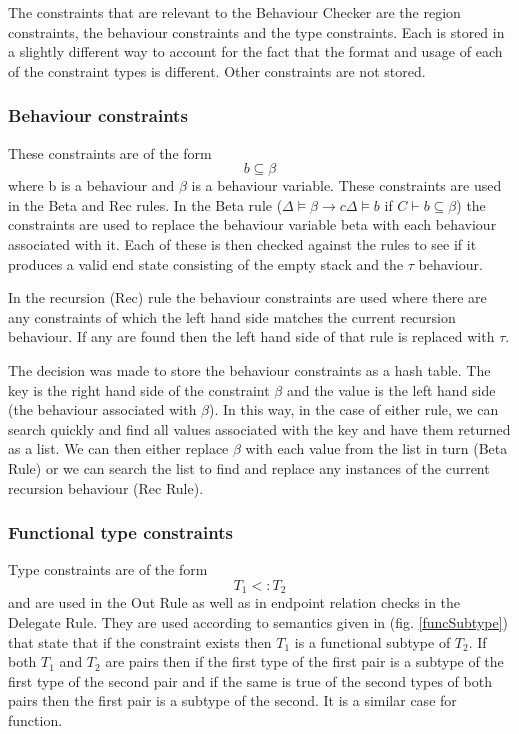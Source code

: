 The constraints that are relevant to the Behaviour Checker are the region constraints, the behaviour constraints and the type constraints. Each is stored in a slightly different way to account for the fact that the format and usage of each of the constraint types is different. Other constraints are not stored. 

\subsubsection{Behaviour constraints}

These constraints are of the form $$b \subseteq \beta$$ where b is a behaviour and $\beta$ is a behaviour variable. These constraints are used in the Beta and Rec rules. In the Beta rule ($\Delta \models \beta \rightarrow c \Delta \models b$ if $C \vdash b \subseteq \beta$) the constraints are used to replace the behaviour variable beta with each behaviour associated with it. Each of these is then checked against the rules to see if it produces a valid end state consisting of the empty stack and the $\tau$ behaviour.  

In the recursion (Rec) rule the behaviour constraints are used where there are any constraints of which the left hand side matches the current recursion behaviour. If any are found then the left hand side of that rule is replaced with $\tau$. 

The decision was made to store the behaviour constraints as a hash table. The key is the right hand side of the constraint $\beta$ and the value is the left hand side (the behaviour associated with $\beta$). In this way, in the case of either rule, we can search quickly and find all values associated with the key and have them returned as a list. We can then either replace $\beta$ with each value from the list in turn (Beta Rule) or we can search the list to find and replace any instances of the current recursion behaviour (Rec Rule). 

\subsubsection{Functional type constraints}

Type constraints are of the form $$T_1 <: T_2$$ and are used in the Out Rule as well as in endpoint relation checks in the Delegate Rule. They are used according to semantics given in (fig. \ref{funcSubtype}) that state that if the constraint exists then $T_1$ is a functional subtype of $T_2$. If both $T_1$ and $T_2$ are pairs then if the first type of the first pair is a subtype of the first type of the second pair and if the same is true of the second types of both pairs then the first pair is a subtype of the second. It is a similar case for function. 

